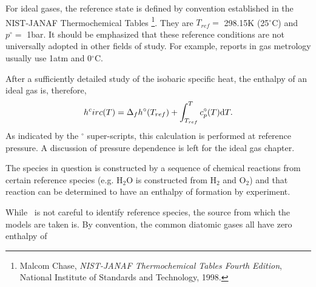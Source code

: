 For ideal gases, the reference state is defined by convention established in the NIST-JANAF Thermochemical Tables \footnote{Malcom Chase, \emph{NIST-JANAF Thermochemical Tables Fourth Edition}, National Institute of Standards and Technology, 1998.}.  They are $T_{ref} = $ 298.15K (25$^\circ$C) and $p^\circ = $ 1bar.  It should be emphasized that these reference conditions are not universally adopted in other fields of study.  For example, reports in gas metrology usually use 1atm and 0$^\circ$C.

After a sufficiently detailed study of the isobaric specific heat, the enthalpy of an ideal gas is, therefore,
\begin{align}
h^circ(T) = \Delta_f h^\circ(T_{ref}) + \int_{T_{ref}}^T c_p^\circ(T) \mathrm{d} T.
\end{align}
As indicated by the $^\circ$ super-scripts, this calculation is performed at reference pressure.  A discussion of pressure dependence is left for the ideal gas chapter.

The species in question is constructed by a sequence of chemical reactions from certain reference species (e.g. H$_2$O is constructed from H$_2$ and O$_2$) and that reaction can be determined to have an enthalpy of formation by experiment.

While \PM\ is not careful to identify reference species, the source from which the models are taken is.  By convention, the common diatomic gases all have zero enthalpy of 
